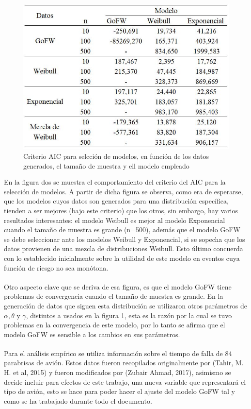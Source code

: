 \documentclass[12pt,a4paper]{article}
\begin{document}
\begin{figure}[h!]
\begin{center}
\includegraphics[scale=0.75]{tala1.JPG}  
\caption{Criterio AIC para selcción de modelos, en función de los datos generados, el tamaño de muestra y ell modelo empleado}
\end{center}
\end{figure}

En la figura dos se muestra el comportamiento del criterio del AIC para la selección de modelos. A partir de dicha figura se observa, como era de esperarse, que los modelos cuyos datos son generados para una distribución específica, tienden a ser mejores (bajo este criterio) que los otros, sin embargo, hay varios resultados interesantes: el modelo Weibull es mejor al modelo Exponencial cuando el tamaño de muestra es grande (n=500), además que el modelo GoFW se debe seleccionar ante los modelos Weibull y Exponencial, si se sopecha que los datos provienen de una mezcla de distribuciones Weibull. Esto último concuerda con lo establecido inicialmente sobre la utilidad de este modelo en eventos cuya función de riesgo no sea monótona.\\
\\
Otro aspecto clave que se deriva de esa figura, es que el modelo GoFW tiene problemas de convergencia cuando el tamaño de muestra es grande. En la generación de datos que siguen esta distribución se utilizaron otros parámetros de $\alpha, \theta$ y $\gamma$, distintos a usados en la figura 1, esta es la razón por la cual se tuvo problemas en la convergencia de este modelo, por lo tanto se afirma que el modelo GoFW es sensible a los cambios en sus parámetros.\\
\\
Para el análisis empírico se utiliza información sobre el tiempo de falla de 84 parabrisas de avión. Estos datos fueron recopilados originalmente por (Tahir, M. H. et al, 2015) y fueron modificados por (Zubair Ahmad, 2017), asimismo se decide incluir para efectos de este trabajo, una nueva variable que representará el tipo de avión, esto se hace para poder hacer el ajuste del modelo GoFW tal y como se ha trabajado durante todo el documento. 
\newpage
\end{document}
